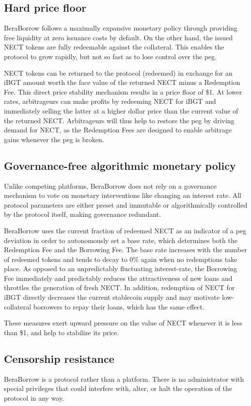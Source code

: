 \documentclass{article}
\begin{document}
\subsection{Hard price floor}
BeraBorrow follows a maximally expansive monetary policy through providing free liquidity at zero issuance costs by default. On the other hand, the issued NECT tokens are fully redeemable against the collateral. This enables the protocol to grow rapidly, but not so fast as to lose control over the peg.

NECT tokens can be returned to the protocol (redeemed) in exchange for an iBGT amount worth the face value of the returned NECT minus a Redemption Fee. This direct price stability mechanism results in a price floor of \$1. At lower rates, arbitrageurs can make profits by redeeming NECT for iBGT and immediately selling the latter at a higher dollar price than the current value of the returned NECT. Arbitrageurs will thus help to restore the peg by driving demand for NECT, as the Redemption Fees are designed to enable arbitrage gains whenever the peg is broken.

\subsection{Governance-free algorithmic monetary policy}
Unlike competing platforms, BeraBorrow does not rely on a governance mechanism to vote on monetary interventions like changing an interest rate. All protocol parameters are either preset and immutable or algorithmically controlled by the protocol itself, making governance redundant.

BeraBorrow uses the current fraction of redeemed NECT as an indicator of a peg deviation in order to autonomously set a base rate, which determines both the Redemption Fee and the Borrowing Fee. The base rate increases with the number of redeemed tokens and tends to decay to 0\% again when no redemptions take place. As opposed to an unpredictably fluctuating interest-rate, the Borrowing Fee immediately and predictably reduces the attractiveness of new loans and throttles the generation of fresh NECT. In addition, redemption of NECT for iBGT directly decreases the current stablecoin supply and may motivate low-collateral borrowers to repay their loans, which has the same effect. 

These measures exert upward pressure on the value of NECT whenever it is less than \$1, and help to stabilize its price.

\subsection{Censorship resistance}
BeraBorrow is a protocol rather than a platform. There is no administrator with special privileges that could interfere with, alter, or halt the operation of the protocol in any way.
\end{document}
